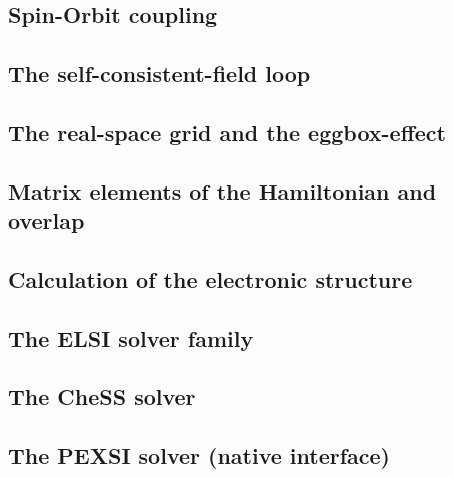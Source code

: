 

\subsection{Spin-Orbit coupling}
\label{sec:spin-orbit}



\subsection{The self-consistent-field loop}
\label{sec:scf}



\vspace{5pt}
\subsection{The real-space grid and the eggbox-effect}



\subsection{Matrix elements of the Hamiltonian and overlap}



\subsection{Calculation of the electronic structure}



\subsection{The ELSI solver family}
\label{SolverELSI}



\subsection{The CheSS solver}
\label{SolverCheSS}



\subsection{The PEXSI solver (native interface)}
\label{SolverPEXSI}

